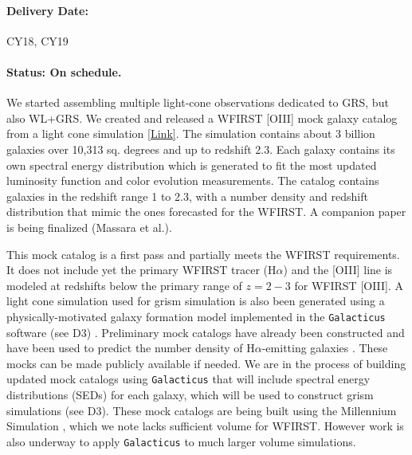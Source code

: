 \paragraph*{Delivery Date:} CY18, CY19

\paragraph*{Status: On schedule.} We started assembling multiple light-cone
observations dedicated to GRS, but also WL+GRS. We created and released a WFIRST
[OIII] mock galaxy catalog from a light cone simulation
\href{http://www.wfirst-hls-cosmology.org/products/}{[Link]}. The simulation
contains about 3 billion galaxies over 10,313 sq. degrees and up to redshift
2.3. Each galaxy contains its own spectral energy distribution which is
generated to fit the most updated luminosity function and color evolution
measurements. The catalog contains galaxies in the redshift range 1 to 2.3, with
a number density and redshift distribution that mimic the ones forecasted for
the WFIRST. A companion paper is being finalized (Massara et al.).

This mock catalog is a first pass and partially meets the WFIRST requirements.
It does not include yet the primary WFIRST tracer (H$\alpha$) and the [OIII] line
is modeled at redshifts below the primary range of $z=2-3$ for WFIRST [OIII]. A
light cone simulation used for grism simulation is also been generated using a
physically-motivated galaxy formation model implemented in the
\texttt{Galacticus} software (see D3) \citep{Benson2010}. Preliminary mock
catalogs have already been constructed and have been used to predict the number
density of H$\alpha$-emitting galaxies \citep{Merson2018}. These mocks can be
made publicly available if needed. We are in the process of building updated
mock catalogs using \texttt{Galacticus} that will include spectral energy
distributions (SEDs) for each galaxy, which will be used to construct grism
simulations (see D3). These mock catalogs are being built using the Millennium
Simulation \citep{Springel05}, which we note lacks sufficient volume for WFIRST.
However work is also underway to apply \texttt{Galacticus} to much larger volume
simulations.

